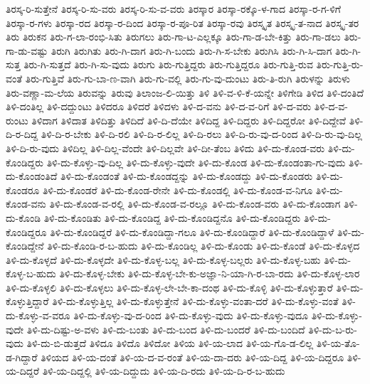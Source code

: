 {ತಿರಸ್ಕ-ರಿ-ಸುತ್ತೇನೆ
ತಿರಸ್ಕ-ರಿ-ಸು-ವರು
ತಿರಸ್ಕ-ರಿ-ಸು-ವ-ವರು
ತಿರಸ್ಕಾರ
ತಿರಸ್ಕಾ-ರಕ್ಕೊ-ಳ-ಗಾದ
ತಿರಸ್ಕಾ-ರ-ಗ-ಳಿಗೆ
ತಿರಸ್ಕಾ-ರ-ಗಳು
ತಿರಸ್ಕಾ-ರದ
ತಿರಸ್ಕಾ-ರ-ದಿಂದ
ತಿರಸ್ಕಾ-ರ-ಪೂ-ರಿತ
ತಿರಸ್ಕಾ-ರವು
ತಿರಸ್ಕೃತ
ತಿರಸ್ಕೃ-ತ-ನಾದ
ತಿರಸ್ಕೃ-ತರ
ತಿರು
ತಿರುಕನ
ತಿರು-ಗ-ಲಾ-ರಂಭಿ-ಸಿತು
ತಿರುಗಲು
ತಿರು-ಗಾ-ಟ-ಎಲ್ಲಕ್ಕೂ
ತಿರು-ಗಾ-ಡ-ಬೇ-ಕಿತ್ತು
ತಿರು-ಗಾ-ಡಲು
ತಿರು-ಗಾ-ಡು-ವಷ್ಟು
ತಿರುಗಿ
ತಿರುಗಿತು
ತಿರು-ಗಿ-ದಾಗ
ತಿರು-ಗಿ-ಬಂದು
ತಿರು-ಗಿ-ಸ-ಬೇಕು
ತಿರುಗಿಸಿ
ತಿರು-ಗಿ-ಸಿ-ದಾಗ
ತಿರು-ಗಿ-ಸುತ್ತ
ತಿರು-ಗಿ-ಸುತ್ತದೆ
ತಿರು-ಗಿ-ಸು-ವುದು
ತಿರುಗು
ತಿರು-ಗುತ್ತಿದ್ದರು
ತಿರು-ಗುತ್ತಿದ್ದರೂ
ತಿರು-ಗುತ್ತಿ-ರುವ
ತಿರು-ಗುತ್ತಿ-ರು-ವಂತೆ
ತಿರು-ಗುತ್ತಿವೆ
ತಿರು-ಗು-ಬಾ-ಣ-ವಾಗಿ
ತಿರು-ಗು-ವಲ್ಲಿ
ತಿರು-ಗು-ವು-ದುಂಟು
ತಿರು-ತಿ-ರುಗಿ
ತಿರುಳನ್ನು
ತಿರುಳು
ತಿರು-ವಣ್ಣಾ-ಮ-ಲೆಯ
ತಿರುವನ್ನು
ತಿರುವು
ತಿಲಾಂಜ-ಲಿ-ಯಿತ್ತು
ತಿಳಿ
ತಿಳಿ-ವ-ಳಿ-ಕೆ-ಯನ್ನೇ
ತಿಳಿಗೇಡಿ
ತಿಳಿದ
ತಿಳಿ-ದಂತಿದೆ
ತಿಳಿ-ದಂತಿಲ್ಲ
ತಿಳಿ-ದದ್ದುಂಟು
ತಿಳಿದರೂ
ತಿಳಿದರೆ
ತಿಳಿದಳು
ತಿಳಿ-ದ-ವನು
ತಿಳಿ-ದ-ವ-ರಿಗೆ
ತಿಳಿ-ದ-ವರು
ತಿಳಿ-ದ-ವ-ರುಂಟು
ತಿಳಿದಾಗ
ತಿಳಿದಾತ
ತಿಳಿದಿತ್ತು
ತಿಳಿದಿದೆ
ತಿಳಿ-ದಿ-ದೆಯೇ
ತಿಳಿದಿದ್ದ
ತಿಳಿ-ದಿದ್ದರು
ತಿಳಿ-ದಿದ್ದರೋ
ತಿಳಿ-ದಿದ್ದೇವೆ
ತಿಳಿ-ದಿ-ರ-ದಿದ್ದ
ತಿಳಿ-ದಿ-ರ-ಬೇಕು
ತಿಳಿ-ದಿ-ರಲಿ
ತಿಳಿ-ದಿ-ರ-ಲಿಲ್ಲ
ತಿಳಿ-ದಿ-ರಲು
ತಿಳಿ-ದಿ-ರು-ವು-ದ-ರಿಂದ
ತಿಳಿ-ದಿ-ರು-ವು-ದಿಲ್ಲ
ತಿಳಿ-ದಿ-ರು-ವುದು
ತಿಳಿದಿಲ್ಲ
ತಿಳಿ-ದಿಲ್ಲ-ವೆಂದೇ
ತಿಳಿ-ದಿಲ್ಲವೇ
ತಿಳಿ-ದೀ-ತೆಂಬ
ತಿಳಿದು
ತಿಳಿ-ದು-ಕೊಂಡ-ವರು
ತಿಳಿ-ದು-ಕೊಂಡಿದ್ದರು
ತಿಳಿ-ದು-ಕೊಳ್ಳು-ವು-ದಿಲ್ಲ
ತಿಳಿ-ದು-ಕೊಳ್ಳು-ವುದೇ
ತಿಳಿ-ದು-ಕೊಂಡ
ತಿಳಿ-ದು-ಕೊಂಡಂತಾ-ಗು-ವುದು
ತಿಳಿ-ದು-ಕೊಂಡಂತಿದೆ
ತಿಳಿ-ದು-ಕೊಂಡಂತೆ
ತಿಳಿ-ದು-ಕೊಂಡದ್ದನ್ನು
ತಿಳಿ-ದು-ಕೊಂಡದ್ದು
ತಿಳಿ-ದು-ಕೊಂಡರು
ತಿಳಿ-ದು-ಕೊಂಡರೂ
ತಿಳಿ-ದು-ಕೊಂಡರೆ
ತಿಳಿ-ದು-ಕೊಂಡ-ರೇನೇ
ತಿಳಿ-ದು-ಕೊಂಡಲ್ಲಿ
ತಿಳಿ-ದು-ಕೊಂಡ-ವ-ನಿಗೂ
ತಿಳಿ-ದು-ಕೊಂಡ-ವನು
ತಿಳಿ-ದು-ಕೊಂಡ-ವ-ರಲ್ಲಿ
ತಿಳಿ-ದು-ಕೊಂಡ-ವ-ರಲ್ಲೂ
ತಿಳಿ-ದು-ಕೊಂಡ-ವರು
ತಿಳಿ-ದು-ಕೊಂಡಾಗ
ತಿಳಿ-ದು-ಕೊಂಡಿ
ತಿಳಿ-ದು-ಕೊಂಡಿತು
ತಿಳಿ-ದು-ಕೊಂಡಿದ್ದ
ತಿಳಿ-ದು-ಕೊಂಡಿದ್ದನೊ
ತಿಳಿ-ದು-ಕೊಂಡಿದ್ದರು
ತಿಳಿ-ದು-ಕೊಂಡಿದ್ದರೂ
ತಿಳಿ-ದು-ಕೊಂಡಿದ್ದರೆ
ತಿಳಿ-ದು-ಕೊಂಡಿದ್ದಾ-ಗಲೂ
ತಿಳಿ-ದು-ಕೊಂಡಿದ್ದಾರೆ
ತಿಳಿ-ದು-ಕೊಂಡಿದ್ದಾಳೆ
ತಿಳಿ-ದು-ಕೊಂಡಿದ್ದೇನೆ
ತಿಳಿ-ದು-ಕೊಂಡಿ-ರ-ಬ-ಹುದು
ತಿಳಿ-ದು-ಕೊಂಡಿಲ್ಲ
ತಿಳಿ-ದು-ಕೊಂಡು
ತಿಳಿ-ದು-ಕೊಂಡೆ
ತಿಳಿ-ದು-ಕೊಳ್ಳದ
ತಿಳಿ-ದು-ಕೊಳ್ಳದೆ
ತಿಳಿ-ದು-ಕೊಳ್ಳದೇ
ತಿಳಿ-ದು-ಕೊಳ್ಳ-ಬಲ್ಲ
ತಿಳಿ-ದು-ಕೊಳ್ಳ-ಬಲ್ಲರು
ತಿಳಿ-ದು-ಕೊಳ್ಳ-ಬಹು
ತಿಳಿ-ದು-ಕೊಳ್ಳ-ಬ-ಹುದು
ತಿಳಿ-ದು-ಕೊಳ್ಳ-ಬೇಕು
ತಿಳಿ-ದು-ಕೊಳ್ಳ-ಬೇ-ಕು-ಅಜ್ಞಾ-ನಿ-ಯಾ-ಗಿ-ರ-ಬಾ-ರದು
ತಿಳಿ-ದು-ಕೊಳ್ಳ-ಲಾರ
ತಿಳಿ-ದು-ಕೊಳ್ಳಲಿ
ತಿಳಿ-ದು-ಕೊಳ್ಳಲು
ತಿಳಿ-ದು-ಕೊಳ್ಳ-ಲೇ-ಬೇ-ಕಾ-ದಂಥ
ತಿಳಿ-ದು-ಕೊಳ್ಳಿ
ತಿಳಿ-ದು-ಕೊಳ್ಳುತ್ತಾರೆ
ತಿಳಿ-ದು-ಕೊಳ್ಳುತ್ತಿದ್ದಾರೆ
ತಿಳಿ-ದು-ಕೊಳ್ಳುತ್ತಿಲ್ಲ
ತಿಳಿ-ದು-ಕೊಳ್ಳುತ್ತೇನೆ
ತಿಳಿ-ದು-ಕೊಳ್ಳು-ವಂತಾ-ದರೆ
ತಿಳಿ-ದು-ಕೊಳ್ಳು-ವಂತೆ
ತಿಳಿ-ದು-ಕೊಳ್ಳು-ವ-ವರೂ
ತಿಳಿ-ದು-ಕೊಳ್ಳು-ವು-ದ-ರಿಂದ
ತಿಳಿ-ದು-ಕೊಳ್ಳು-ವುದು
ತಿಳಿ-ದು-ಕೊಳ್ಳು-ವುದೂ
ತಿಳಿ-ದು-ಕೊಳ್ಳು-ವುದೇ
ತಿಳಿ-ದು-ದಿಷ್ಟು-ಅ-ವಳು
ತಿಳಿ-ದು-ಬಂತು
ತಿಳಿ-ದು-ಬಂದ
ತಿಳಿ-ದು-ಬಂದರೆ
ತಿಳಿ-ದು-ಬಂದಿದೆ
ತಿಳಿ-ದು-ಬ-ರು-ವುದು
ತಿಳಿ-ದು-ಬಿ-ಡುತ್ತದೆ
ತಿಳಿದೂ
ತಿಳಿದೊ
ತಿಳಿದೋ
ತಿಳಿಯ
ತಿಳಿ-ಯ-ಲಾದ
ತಿಳಿ-ಯ-ಗೊ-ಡ-ಲಿಲ್ಲ
ತಿಳಿ-ಯ-ತೊ-ಡ-ಗಿದ್ದಾರೆ
ತಿಳಿಯದ
ತಿಳಿ-ಯ-ದಂತೆ
ತಿಳಿ-ಯ-ದ-ವ-ರಂತೆ
ತಿಳಿ-ಯ-ದಾ-ದರು
ತಿಳಿ-ಯ-ದಿದ್ದ
ತಿಳಿ-ಯ-ದಿದ್ದರೂ
ತಿಳಿ-ಯ-ದಿದ್ದರೆ
ತಿಳಿ-ಯ-ದಿದ್ದಲ್ಲಿ
ತಿಳಿ-ಯ-ದಿದ್ದುದು
ತಿಳಿ-ಯ-ದಿ-ರದು
ತಿಳಿ-ಯ-ದಿ-ರ-ಬ-ಹುದು
}
